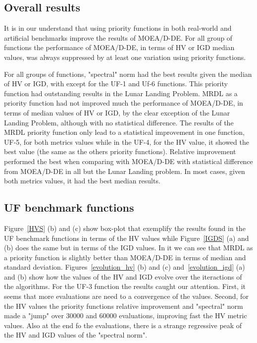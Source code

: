 \subsection{Overall results}



It is in our understand that using priority functions in both real-world and artificial benchmarks improve the results of MOEA/D-DE. For all group of functions the performance of MOEA/D-DE, in terms of HV or IGD median values, was always suppressed by at least one variation using priority functions. 

For all groups of functions, "spectral" norm had the best results given the median of HV or IGD, with except for the  UF-1  and Uf-6 functions. This priority function had outstanding results in the Lunar Landing Problem. MRDL as a priority function had not improved much the performance of MOEA/D-DE, in terms of median values of HV or IGD, by the clear exception of the Lunar Landing Problem, although with no statistical difference. The results of the MRDL priority function only lead to a statistical improvement in one function, UF-5, for both metrics values while in the UF-4, for the HV value, it showed the best value (the same as the others priority functions). Relative improvement performed the best when comparing with MOEA/D-DE with statistical difference from MOEA/D-DE in all but the Lunar Landing problem. In most cases, given both metrics values, it had the best median results. 



\subsection{UF benchmark functions}

Figure~\ref{HVS} (b) and (c) show box-plot that exemplify the results found in the UF benchmark functions in terms of the HV values while Figure~\ref{IGDS} (a) and (b) does the same but in terms of the IGD values. In it we can see that MRDL as a priority function is slightly better than MOEA/D-DE in terms of median and standard deviation.  Figures~\ref{evolution_hv} (b) and (c) and~\ref{evolution_igd} (a) and (b) show how the values of the HV and IGD evolve over the iteractions of the algorithms. For the UF-3 function the results caught our attention. First, it seems that more evaluations are need to a convergence of the values. Second, for the HV values the priority functions relative improvement and "spectral" norm made a "jump" over 30000 and 60000 evaluations, improving fast the HV metric values. Also at the end fo the evaluations, there is a strange regressive peak of the HV and IGD values of the "spectral norm".


